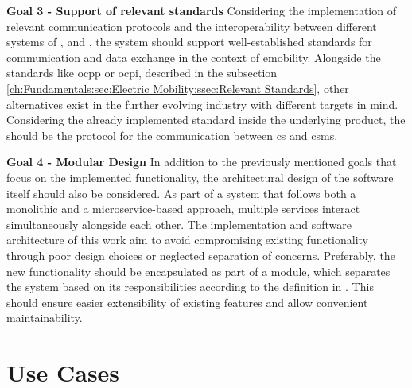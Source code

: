 \noindent \textbf{Goal 3 - Support of relevant standards} Considering the implementation of relevant communication protocols and the interoperability between different systems of ,  and , the system should support well-established standards for communication and data exchange in the context of \acrshort{emobility}. 
Alongside the standards like \acrshort{ocpp} or \acrshort{ocpi}, described in the subsection \ref{ch:Fundamentals:sec:Electric Mobility:ssec:Relevant Standards}, other alternatives exist in the further evolving industry with different targets in mind. 
Considering the already implemented standard inside the underlying product, the  should be the protocol for the communication between \acrshort{cs} and \acrshort{csms}.

\noindent \textbf{Goal 4 - Modular Design} In addition to the previously mentioned goals that focus on the implemented functionality, the architectural design of the software itself should also be considered. 
As part of a system that follows both a monolithic and a microservice-based approach, multiple services interact simultaneously alongside each other. The implementation and software architecture of this work aim to avoid compromising existing functionality through poor design choices or neglected separation of concerns. 
Preferably, the new functionality should be encapsulated as part of a module, which separates the system based on its responsibilities according to the definition in \cite{clements_documenting_2011}. This should ensure easier extensibility of existing features and allow convenient maintainability.

\section{Use Cases}
\label{ch:Requirements Engineering:sec:Use Cases}

